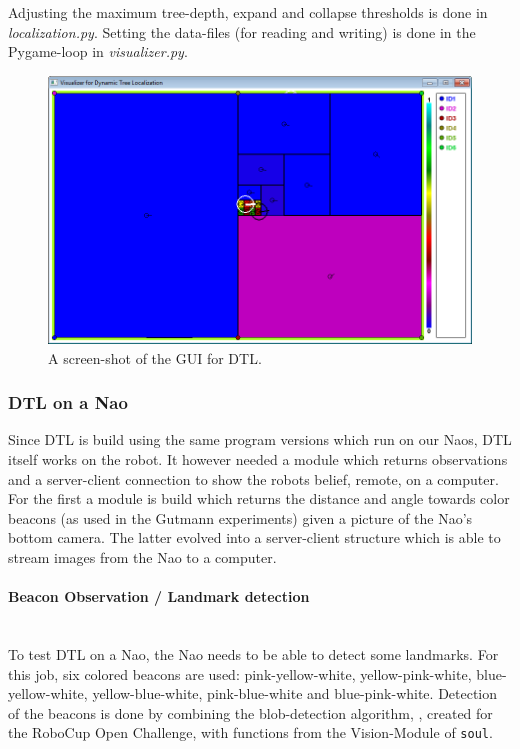 \documentclass[11pt,a4paper,oneside]{article}
\begin{document}
Adjusting the maximum tree-depth, expand and collapse thresholds is done in \textit{localization.py}. Setting the data-files (for reading and writing) is done in the Pygame-loop in \textit{visualizer.py}.

\begin{figure}
\centering
\includegraphics[width=12cm]{DTL_GUI.png}
\caption{A screen-shot of the GUI for DTL.}
\label{fig:DTLGUI}
\end{figure}


\subsubsection{DTL on a Nao}
Since DTL is build using the same program versions which run on our Naos, DTL itself works on the robot. It however needed a module which returns observations and a server-client connection to show the robots belief, remote, on a computer. For the first a module is build which returns the distance and angle towards color beacons (as used in the Gutmann experiments) given a picture of the Nao's bottom camera. The latter evolved into a server-client structure which is able to stream images from the Nao to a computer.

\paragraph{Beacon Observation /  Landmark detection} \indent \\
To test DTL on a Nao, the Nao needs to be able to detect some landmarks. For this job, six colored beacons are used: pink-yellow-white, yellow-pink-white, blue-yellow-white, yellow-blue-white, pink-blue-white and blue-pink-white. Detection of the beacons is done by combining the blob-detection algorithm, \cite{vanBellen2011}, created for the RoboCup Open Challenge, with functions from the Vision-Module of \texttt{soul}. 
\end{document}
